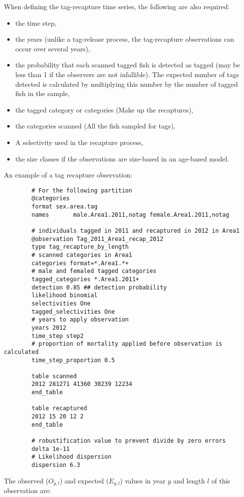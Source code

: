 When defining the tag-recapture time series, the following are also required:

\begin{itemize}
	\item the time step,
	\item the years (unlike a tag-release process, the tag-recapture observations can occur over several years),
	\item the probability that each scanned tagged fish is detected as tagged (may be less than 1 if the observers are not infallible). The expected number of tags detected is calculated by multiplying this number by the number of tagged fish in the sample,
	\item the tagged category or categories (Make up the recaptures),
	\item the categories scanned (All the fish sampled for tags),
	\item A selectivity used in the recapture process,
	\item the size classes if the observations are size-based in an age-based model.
\end{itemize}


An example of a tag recapture observation:

{\small{\begin{verbatim}
		# For the following partition
		@categories
		format sex.area.tag
		names  		male.Area1.2011,notag female.Area1.2011,notag
		
		# individuals tagged in 2011 and recaptured in 2012 in Area1
		@observation Tag_2011_Area1_recap_2012
		type tag_recapture_by_length
		# scanned categories in Area1
		categories format=*.Area1.*+
		# male and femaled tagged categories
		tagged_categories *.Area1.2011+
		detection 0.85 ## detection probability
		likelihood binomial
		selectivities One
		tagged_selectivities One
		# years to apply observation
		years 2012
		time_step step2
		# proportion of mortality applied before observation is calculated
		time_step_proportion 0.5
		
		table scanned
		2012 281271 41360 30239 12234
		end_table
		
		table recaptured
		2012 15 20 12 2
		end_table
		
		# robustification value to prevent divide by zero errors
		delta 1e-11
		# Likelihood dispersion
		dispersion 6.3
		\end{verbatim}}}

The observed ($O_{y,l}$) and expected ($E_{y,l}$) values in year $y$ and length $l$ of this observation are:

